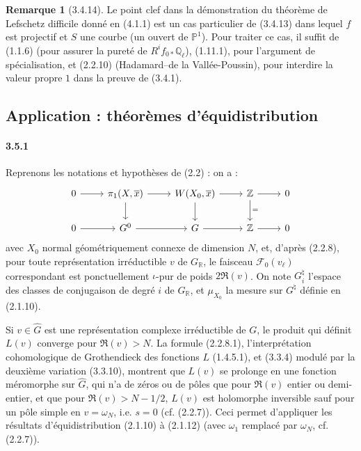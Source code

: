 \documentclass[12pt,a4paper]{article}
\theoremstyle{plain}
\theoremstyle{definition}
\newtheorem{remark}[theorem]{Remarque}
\theoremstyle{remark}
\newcommand{\QQ}{{\mathbb{Q}}}
\newcommand{\RR}{{\mathbb{R}}}
\newcommand{\ZZ}{{\mathbb{Z}}}
\newcommand{\PP}{{\mathbb{P}}}
\begin{document}
\begin{remark}[3.4.14]
Le point clef dans la d\'emonstration du th\'eor\`eme de Lefschetz difficile donn\'e en (4.1.1) est un cas particulier de (3.4.13) dans lequel $f$ est projectif et $S$ une courbe (un ouvert de $\PP^1$). Pour traiter ce cas, il suffit de (1.1.6) (pour assurer la puret\'e de $R^i f_{0*} \QQ_\ell$), (1.11.1), pour l'argument de sp\'ecialisation, et (2.2.10) (Hadamard--de la Vall\'ee-Poussin), pour interdire la valeur propre $1$ dans la preuve de (3.4.1).
\end{remark}

\subsection{Application : th\'eor\`emes d'\'equidistribution}

\paragraph{3.5.1}
Reprenons les notations et hypoth\`eses de (2.2) : on a :
\[
\begin{tikzcd}
0 \arrow[r] & \pi_1(X, \overline{x}) \arrow[r] \arrow[d] & W(X_0, \overline{x}) \arrow[r] \arrow[d] & \ZZ \arrow[r] \arrow[d, "="] & 0 \\
0 \arrow[r] & G^0 \arrow[r] & G \arrow[r] & \ZZ \arrow[r] & 0
\end{tikzcd}
\]
avec $X_0$ normal g\'eom\'etriquement connexe de dimension $N$, et, d'apr\`es (2.2.8), pour toute repr\'esentation irr\'eductible $v$ de $G_\RR$, le faisceau $\mathscr{F}_0(v_\ell)$ correspondant est ponctuellement $\iota$-pur de poids $2\Re(v)$. On note $G_i^\natural$ l'espace des classes de conjugaison de degr\'e $i$ de $G_\RR$, et $\mu_{X_0}$ la mesure sur $G^\natural$ d\'efinie en (2.1.10).

Si $v \in \widehat{G}$ est une repr\'esentation complexe irr\'eductible de $G$, le produit qui d\'efinit $L(v)$ converge pour $\Re(v) > N$. La formule (2.2.8.1), l'interpr\'etation cohomologique de Grothendieck des fonctions $L$ (1.4.5.1), et (3.3.4) modul\'e par la deuxi\`eme variation (3.3.10), montrent que $L(v)$ se prolonge en une fonction m\'eromorphe sur $\widehat{G}$, qui n'a de z\'eros ou de p\^oles que pour $\Re(v)$ entier ou demi-entier, et que pour $\Re(v) > N - 1/2$, $L(v)$ est holomorphe inversible sauf pour un p\^ole simple en $v = \omega_{N}$, i.e. $s = 0$ (cf. (2.2.7)). Ceci permet d'appliquer les r\'esultats d'\'equidistribution (2.1.10) \`a (2.1.12) (avec $\omega_1$ remplac\'e par $\omega_N$, cf. (2.2.7)).
\end{document}
